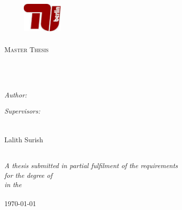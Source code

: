 \documentclass[11pt, a4paper, oneside]{Thesis} %
\begin{document}
\begin{titlepage}

\begin{center}

 \begin{flushleft}
 \begin{figure}[htbp]
 \includegraphics[width=2cm, height=2cm ]{./Figures/tu.pdf}\
\textsc{\LARGE\LARGE \univname}\\[1.5cm] %
\end{figure} 
 \end{flushleft}
    

\textsc{\Large Master Thesis}\\[0.5cm] %

\HRule \\[0.4cm] %
{\huge \bfseries \ttitle}\\[0.4cm] %
\HRule \\[1.5cm] %
 
\begin{minipage}{0.4\textwidth}
\begin{flushleft} \large
\emph{Author:}\\
{\authornames} %
\end{flushleft}
\end{minipage}
\begin{minipage}{0.3\textwidth}
\begin{flushleft} \large
\emph{Supervisors:} \\
{\supname}\\ %
{\examname}\\
{Lalith Surish} 
 
\end{flushleft}
\end{minipage}\\[3cm]
 
\large \textit{A thesis submitted in partial fulfilment of the requirements\\ for the degree of \degreename}\\[0.3cm] %
\textit{in the}\\[0.4cm]
\groupname\\[2cm] %
 
{\large \today}\\[4cm] %
 
\vfill
\end{center}

\end{titlepage}
\end{document}
